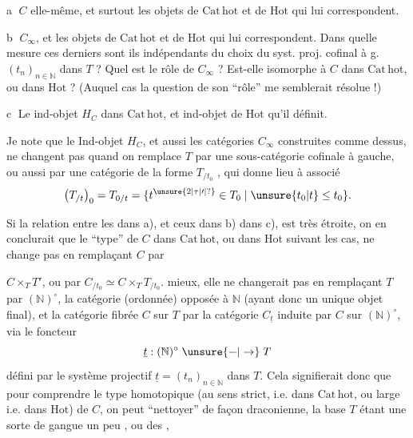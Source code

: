 \textcircled{a} $C$ elle-même,   et surtout les objets de $\mathrm{Cat\,hot}$ et de $\mathrm{Hot}$ qui lui correspondent.


\textcircled{b} $C_\infty$, et les objets de $\mathrm{Cat\,hot}$ et de $\mathrm{Hot}$ qui lui correspondent. Dans quelle mesure ces derniers sont ils indépendants du choix du syst. proj. cofinal à g. $(t_n)_{n\in\mathbb N}$ dans $T$ ? Quel est le rôle de $C_\infty$ ? Est-elle  isomorphe à $C$ dans $\mathrm{Cat\,hot}$, ou dans $\mathrm{Hot}$ ? (Auquel cas la question de son ``rôle'' me semblerait résolue !)

\textcircled{c} Le ind-objet $H_C$ dans $\mathrm{Cat\,hot}$, et  ind-objet de $\mathrm{Hot}$ qu'il définit.

Je note que le Ind-objet $H_C$, et aussi les catégories $C_\infty$ construites comme dessus, ne changent pas quand on remplace $T$ par une sous-catégorie  cofinale à gauche, ou  aussi par une catégorie de la forme $T_{/t_0}$ , qui donne lieu à    associé
\[
\bigl(T_{/t}\bigr)_0=T_{0/t}=\{t^{\unsure{2|\tau|\prime|?}}\in T_0\mid \unsure{t_0|t}\leq t_0\}.
\]

Si la relation entre les   dans a), et ceux dans b)  dans c), est très étroite, on en conclurait que le ``type''  de $C$ dans $\mathrm{Cat\,hot}$, ou dans $\mathrm{Hot}$ suivant les cas, ne change pas en remplaçant $C$ par


$C\times_T T'$, ou par $C_{/t_0}\simeq C\times_T T_{/t_0}$.   mieux, elle ne changerait pas en remplaçant $T$ par $(\mathbb N)^\circ$, la catégorie (ordonnée) opposée à $\mathbb N$ (ayant donc un unique objet final), et la catégorie fibrée $C$ sur $T$ par la catégorie $C_{\underline t}$ induite par $C$ sur $(\mathbb N)^\circ$, via le foncteur
\[
\underline t:(\mathbb N)^\circ\mathrel{\unsure{-|\to}}T
\]
défini par le système projectif $\underline t=(t_n)_{n\in\mathbb N}$ dans $T$. Cela signifierait donc que pour comprendre le type homotopique (au sens strict, i.e. dans $\mathrm{Cat\,hot}$, ou large i.e. dans $\mathrm{Hot}$) de $C$, on peut  ``nettoyer'' de façon draconienne, la base $T$ étant  une sorte de gangue un peu , ou des  ,

